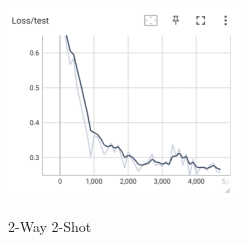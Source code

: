 \documentclass[12pt]{article}
\begin{document}
\begin{figure}[htbp]
\begin{minipage}{0.4\linewidth}
		\includegraphics[width=0.9\linewidth]{./figures/2w2s_test_loss.png}
		\label{pic three}%
	\end{minipage}
    \caption{2-Way 2-Shot}
    \label{2w2s}
    \end{figure}
\end{document}
